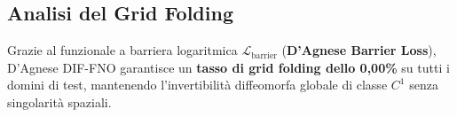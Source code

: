 \documentclass[11pt,a4paper]{article}
\begin{document}
\subsection{Analisi del Grid Folding}
Grazie al funzionale a barriera logaritmica $\mathcal{L}_{\text{barrier}}$ (\textbf{D'Agnese Barrier Loss}), D'Agnese DIF-FNO garantisce un \textbf{tasso di grid folding dello 0,00\%} su tutti i domini di test, mantenendo l'invertibilità diffeomorfa globale di classe $C^1$ senza singolarità spaziali.
\end{document}
